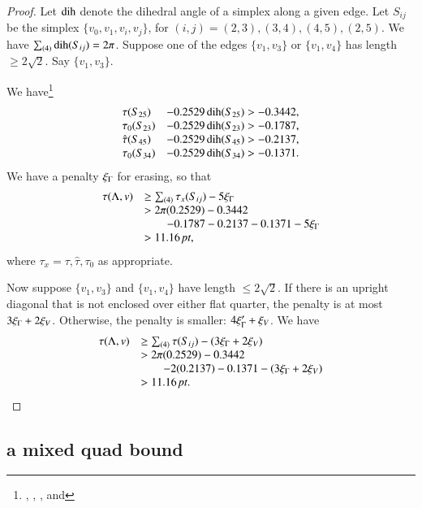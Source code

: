 \begin{proof}
Let $\operatorname{dih}$ denote the dihedral angle of a simplex along a given
edge. Let $S_{ij}$ be the simplex $\{v_0,v_1,v_i,v_j\}$, for
$(i,j)=(2,3),(3,4), (4,5),(2,5)$. We have $\sum_{(4)}\operatorname{dih}(S_{ij})
= 2\pi$. Suppose one of the edges $\{v_1,v_3\}$ or $\{v_1,v_4\}$ has
length $\ge2\sqrt2$. Say $\{v_1,v_3\}$.

We have\footnote{, ,
, and }
    $$
    \begin{array}{lll}
    \tau(S_{25}) &- 0.2529\operatorname{dih}(S_{25}) > -0.3442,\\
    \tau_0(S_{23}) &- 0.2529\operatorname{dih}(S_{23}) > -0.1787,\\
    \hat\tau(S_{45}) &- 0.2529\operatorname{dih}(S_{45}) > -0.2137,\\
    \tau_0(S_{34}) &- 0.2529\operatorname{dih}(S_{34}) > -0.1371.\\
    \end{array}
    $$
We have a penalty $\xi_\Gamma$ for erasing, so that
    $$
    \begin{array}{lll}
        \tau(\Lambda,v) &\ge \sum_{(4)}\tau_x(S_{ij}) - 5\xi_\Gamma\\
                &>2\pi(0.2529)-0.3442\\
                &\qquad -0.1787-0.2137-0.1371-5\xi_\Gamma\\
                &>11.16\,\hbox{\it pt},
    \end{array}
    $$
where $\tau_x=\tau,\hat\tau,\tau_0$ as appropriate.

Now suppose $\{v_1,v_3\}$ and $\{v_1,v_4\}$ have length $\le2\sqrt2$.
If there is an upright diagonal that is not enclosed over either
flat quarter, the penalty is at most $3\xi_\Gamma+2\xi_V$. Otherwise, the
penalty is smaller: $4\xi_\Gamma'+\xi_V$. We have
    $$
    \begin{array}{lll}
    \tau(\Lambda,v)
    &\ge \sum_{(4)}\tau(S_{ij})-(3\xi_\Gamma+2\xi_V)\\
    &>2\pi(0.2529)-0.3442\\
    &\qquad -2(0.2137)-0.1371 -(3\xi_\Gamma+2\xi_V)\\
    &>11.16\,\hbox{\it pt}.\\
    \end{array}
    $$
\end{proof}


\subsection{a mixed quad bound}%

